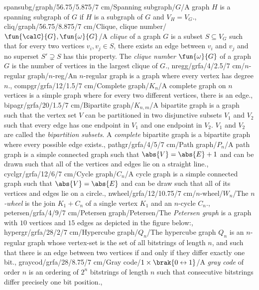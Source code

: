 spansubg/graph/56.75/5.875/7 cm/{Spanning subgraph}/{\spanning{}$ G$}/{A graph $H$ is a spanning subgraph of $G$ if $H$ is a subgraph of $G$ and $V_H=V_G$.},
cliq/graph/56.75/8.875/7 cm/{Clique, clique number}/{$\fun{\calC}{G}, \fun{\omega}{G}$}/{A \emph{clique} of a graph $G$ is a subset $S\subseteq V_G$ such that for every two vertices $v_i,v_j\in S$, there exists an edge between $v_i$ and $v_j$ and no superset $S'\supsetneq S$ has this property. The \emph{clique number} $\fun{\omega}{G}$ of a graph $G$ is the number of vertices in the largest clique of $G$.},
nregg/grfa/4/2.5/7 cm/{$n$-regular graph}/{$n$-reg}/{An $n$-regular graph is a graph where every vertex has degree $n$.},%
compgr/grfa/12/1.5/7 cm/{Complete graph}/{$K_n$}/{A complete graph on $n$ vertices is a simple graph where for every two different vertices, there is an edge.},%
bipagr/grfa/20/1.5/7 cm/{Bipartite graph}/{$K_{n,m}$}/{A bipartite graph is a graph such that the vertex set $V$ can be partitioned in two disjunctive subsets $V_1$ and $V_2$ such that every edge has one endpoint in $V_1$ and one endpoint in $V_2$. $V_1$ and $V_2$ are called the \emph{bipartition subsets}. A \emph{complete} bipartite graph is a bipartite graph where every possible edge exists.},%
pathgr/grfa/4/5/7 cm/{Path graph}/{$P_n$}/{A path graph is a simple connected graph such that $\abs{V}=\abs{E}+1$ and can be drawn such that all of the vertices and edges lie on a straight line.},%
cyclgr/grfa/12/6/7 cm/{Cycle graph}/{$C_n$}/{A cycle graph is a simple connected graph such that $\abs{V}=\abs{E}$ and can be draw such that all of its vertices and edges lie on a circle.},%
nwheel/grfa/12/10.75/7 cm/{$n$-wheel}/{$W_n$}/{The \emph{$n$-wheel} is the join $K_1+C_n$ of a single vertex $K_1$ and an $n$-cycle $C_n$.},%
petersen/grfa/4/9/7 cm/{Petersen graph}/{Petersen}/{The \emph{Petersen graph} is a graph with $10$ vertices and $15$ edges as depicted in the figure below:},
hypergr/grfa/28/2/7 cm/{Hypercube graph}/{$Q_n$}/{The hypercube graph $Q_n$ is an $n$-regular graph whose vertex-set is the set of all bitstrings of length $n$, and such that there is an edge between two vertices if and only if they differ exactly one bit.},%
graycod/grfa/28/8.75/7 cm/{Gray code}/{$1\times \brak{0\leftrightarrow 1}$}/{A \emph{gray code} of order $n$ is an ordering of $2^n$ bitstrings of length $n$ such that consecutive bitstrings differ precisely one bit position.},%
